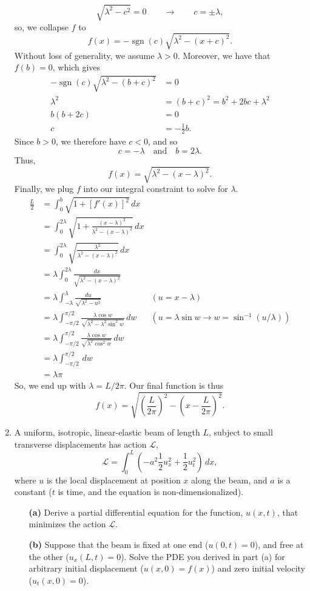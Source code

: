 \documentclass[10pt,letterpaper]{report}
\newcommand{\so}{\qquad \rightarrow \qquad}
\DeclareMathOperator{\sgn}{sgn}
\begin{document}
\begin{enumerate}
\[
\sqrt{\lambda^2 - c^2} = 0 \so c = \pm \lambda,
\]
so, we collapse $f$ to 
\[
f(x) = -\sgn(c) \sqrt{\lambda^2 - (x+c)^2}.
\]
Without loss of generality, we assume $\lambda > 0$. Moreover, we have that $f(b) = 0$, which gives
\begin{align*}
-\sgn(c)\sqrt{\lambda^2 - (b + c)^2} &= 0
\\
\lambda^2 &= (b + c)^2 = b^2 + 2bc + \lambda^2
\\
b(b + 2c) &= 0
\\
c &= -\frac{1}{2}b.
\end{align*}
Since $b > 0$, we therefore have $c < 0$, and so
\[
c = -\lambda \quad\textrm{and}\quad b = 2\lambda.
\]
Thus, 
\[
f(x) = \sqrt{\lambda^2 - (x-\lambda)^2}.
\]
Finally, we plug $f$ into our integral constraint to solve for $\lambda$.
\begin{align*}
\frac{L}{2} &= 
\int_0^b \sqrt{1 + \left[f'(x)\right]^2}\,dx
\\
&=
\int_0^{2 \lambda} \sqrt{1 + \frac{(x - \lambda)^2}{\lambda^2 - (x - \lambda)^2}}\,dx
\\
&=
\int_0^{2 \lambda} \sqrt{\frac{\lambda^2}{\lambda^2 - (x - \lambda)^2}}\,dx
\\
&=
\lambda\int_0^{2 \lambda} \frac{dx}{\sqrt{\lambda^2 - (x - \lambda)^2}}
\\
&=
\lambda\int_{-\lambda}^{\lambda} \frac{du}{\sqrt{\lambda^2 - u^2}}
&
(u = x - \lambda)
\\
&=
\lambda\int_{-\pi/2}^{\pi/2} \frac{\lambda\cos w }{\sqrt{\lambda^2 - \lambda^2\sin^2 w}}\,dw
&
(u = \lambda\sin w \rightarrow w = \sin^{-1}(u/\lambda))
\\
&=
\lambda\int_{-\pi/2}^{\pi/2} \frac{\lambda\cos w }{\sqrt{\lambda^2\cos^2 w}}\,dw
\\
&=
\lambda\int_{-\pi/2}^{\pi/2}\,dw
\\
&=
\lambda\pi
\end{align*}
So, we end up with $\lambda = L/ 2\pi$. Our final function is thus
\[
f(x) = \sqrt{\left(\frac{L}{2\pi}\right)^2 - \left(x - \frac{L}{2\pi}\right)^2}.
\]

\item \begin{qbox}
A uniform, isotropic, linear-elastic beam of length $L$, subject to small transverse displacements has action $\mathcal L$,
\[
\mathcal L = \int_0^L \left(-a^2 \frac{1}{2}u_x^2 + \frac{1}{2}u_t^2\right)\,dx,
\]
where $u$ is the local displacement at position $x$ along the beam, and $a$ is a constant ($t$ is time, and the equation is non-dimensionalized).
\begin{itemize}
    \item[\textbf{(a)}] Derive a partial differential equation for the function, $u(x,t)$, that minimizes the action $\mathcal L$.
    \item [\textbf{(b)}] Suppose that the beam is fixed at one end ($u(0,t) = 0$), and free at the other ($u_x(L,t) = 0$). Solve the PDE you derived in part (a) for arbitrary initial displacement ($u(x, 0) = f (x)$) and zero initial velocity ($u_t(x, 0) = 0$).
    

\end{itemize}
\end{qbox}
\end{enumerate}
\end{document}
